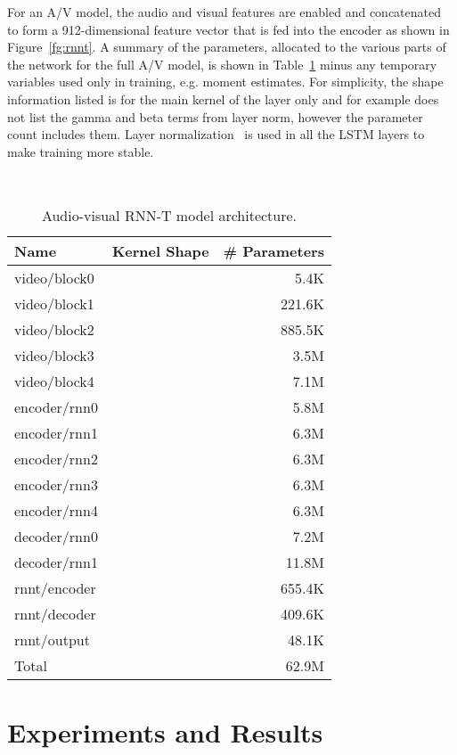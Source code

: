 \documentclass{article}
\newcommand{\negsectionspace}{\vspace{-4pt}}
\newcommand{\negfigspace}{\vspace{-4pt}}
\begin{document}
For an A/V model, the audio and visual features are enabled
and concatenated to form a 912-dimensional feature vector that is fed
into the encoder as shown in Figure~\ref{fg:rnnt}. A summary of the
parameters, allocated to the various parts of the network for the full A/V
model, is shown in Table~\ref{tb:avparams} minus any temporary
variables used only in training, e.g. moment estimates.  For
simplicity, the shape information listed is for the main kernel of the
layer only and for example does not list the gamma and beta terms from
layer norm, however the parameter count includes them. Layer
normalization~\cite{layernorm16} is used in all the LSTM layers to
make training more stable.

\begin{table}[th]
\negfigspace
  \footnotesize
\centering
  \quad \\
  \begin{tabular}{llr}
    \toprule
Name            & Kernel Shape & \# Parameters \\
    \midrule
video/block0 &  & 5.4K \\
video/block1 &  & 221.6K \\
video/block2 &  & 885.5K \\
video/block3 &  & 3.5M \\
video/block4 &  & 7.1M \\
encoder/rnn0 &  & 5.8M \\
encoder/rnn1 &  & 6.3M \\
encoder/rnn2 &  & 6.3M \\
encoder/rnn3 &  & 6.3M \\
encoder/rnn4 &  & 6.3M \\
decoder/rnn0 &  & 7.2M \\
decoder/rnn1 &  & 11.8M \\
rnnt/encoder & & 655.4K \\
rnnt/decoder & & 409.6K \\
rnnt/output  & & 48.1K \\
\midrule
Total           &  & 62.9M \\
\bottomrule
\end{tabular}
 \caption{Audio-visual RNN-T model architecture.}
\label{tb:avparams}
\negfigspace
\vspace{-6pt}
\end{table}


\negsectionspace
\section{Experiments and Results}
\label{Experiments}
\negsectionspace
\end{document}
